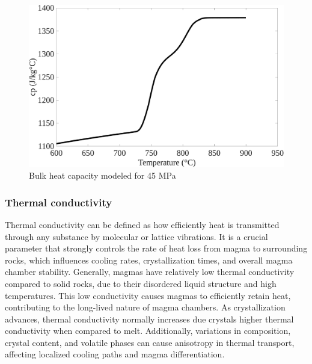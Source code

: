 \begin{figure}[H]
	\centering
	\includegraphics[width=1\linewidth]{img/chapter2/properties/heat_capacity/SMOOTHED_cp.png}
	\caption{Bulk heat capacity modeled for 45 MPa}
	\label{fig:heat_capacity}
\end{figure}

\subsubsection{Thermal conductivity}
Thermal conductivity can be defined as how efficiently heat is transmitted through any substance by molecular or lattice vibrations. It is a crucial parameter that strongly controls the rate of heat loss from magma to surrounding rocks, which influences cooling rates, crystallization times, and overall magma chamber stability. Generally, magmas have relatively low thermal conductivity compared to solid rocks, due to their disordered liquid structure and high temperatures. This low conductivity causes magmas to efficiently retain heat, contributing to the long-lived nature of magma chambers. As crystallization advances, thermal conductivity normally increases due crystals higher thermal conductivity when compared to melt. Additionally, variations in composition, crystal content, and volatile phases can cause anisotropy in thermal transport, affecting localized cooling paths and magma differentiation.

